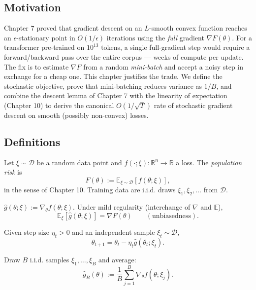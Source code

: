 \subsection*{Motivation}

Chapter 7 proved that gradient descent on an $L$-smooth convex function reaches an $\epsilon$-stationary point in $O(1/\epsilon)$ iterations using the \emph{full} gradient $\nabla F(\theta)$. For a transformer pre-trained on $10^{13}$ tokens, a single full-gradient step would require a forward/backward pass over the entire corpus --- weeks of compute per update. The fix is to estimate $\nabla F$ from a random \emph{mini-batch} and accept a noisy step in exchange for a cheap one. This chapter justifies the trade. We define the stochastic objective, prove that mini-batching reduces variance as $1/B$, and combine the descent lemma of Chapter 7 with the linearity of expectation (Chapter 10) to derive the canonical $O(1/\sqrt{T})$ rate of stochastic gradient descent on smooth (possibly non-convex) losses.

\subsection*{Definitions}

\begin{definition}
Let $\xi \sim \mathcal{D}$ be a random data point and $f(\cdot; \xi) : \mathbb{R}^n \to \mathbb{R}$ a loss. The \emph{population risk} is
\[
F(\theta) := \mathbb{E}_{\xi \sim \mathcal{D}}[f(\theta; \xi)],
\]
in the sense of Chapter 10. Training data are i.i.d. draws $\xi_1, \xi_2, \dots$ from $\mathcal{D}$.
\end{definition}

\begin{definition}
$\hat g(\theta; \xi) := \nabla_\theta f(\theta; \xi)$. Under mild regularity (interchange of $\nabla$ and $\mathbb{E}$),
\[
\mathbb{E}_{\xi}[\hat g(\theta; \xi)] = \nabla F(\theta) \qquad (\text{unbiasedness}).
\]
\end{definition}

\begin{definition}
Given step size $\eta_t > 0$ and an independent sample $\xi_t \sim \mathcal{D}$,
\[
\theta_{t+1} = \theta_t - \eta_t \hat g(\theta_t; \xi_t).
\]
\end{definition}

\begin{definition}
Draw $B$ i.i.d. samples $\xi_1, \dots, \xi_B$ and average:
\[
\hat g_B(\theta) := \frac{1}{B} \sum_{j=1}^{B} \nabla_\theta f(\theta; \xi_j).
\]
\end{definition}

